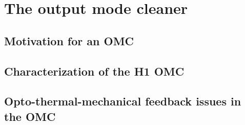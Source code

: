 \chapter{The output mode cleaner}

\section{Motivation for an OMC}

\section{Characterization of the H1 OMC}

\section{Opto-thermal-mechanical feedback issues in the OMC}

